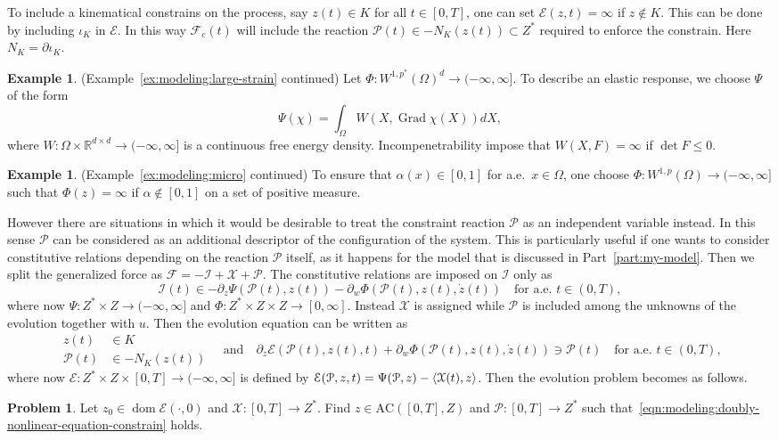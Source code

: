 \documentclass[a4paper,10pt,oneside]{amsbook}
\numberwithin{section}{chapter}
\numberwithin{equation}{chapter}
\theoremstyle{definition}
\newtheorem{ex}[prop]{Example}
\newtheorem{prb}[prop]{Problem}
\DeclareMathOperator{\dom}{dom}
\DeclareMathOperator{\Grad}{Grad}
\DeclarePairedDelimiter{\dual}{\langle}{\rangle}
\begin{document}
To include a kinematical constrains on the process, say $z(t)\in K$ for all $t\in[0,T]$, one can set $\mathcal{E}(z,t)=\infty$ if $z\notin K$. This can be done by including $\iota_K$ in $\mathcal{E}$. In this way $\mathcal{F}_c(t)$ will include the reaction $\mathcal{P}(t)\in-N_K(z(t))\subset Z^*$ required to enforce the constrain. Here $N_K=\partial\iota_K$.
\begin{ex}(Example~\ref{ex:modeling:large-strain} continued)
Let $\Phi\colon W^{1,p^*}(\Omega)^d\to(-\infty,\infty]$. To describe an elastic response, we choose $\Psi$ of the form
\[
\Psi(\chi)=\int_\Omega W(X,\Grad\chi(X))dX,
\]
where $W\colon\Omega\times\mathbb{R}^{d\times d}\to(-\infty,\infty]$ is a continuous free energy density. Incompenetrability impose that $W(X,F)=\infty$ if $\det F\le0$.
\end{ex}
\begin{ex}(Example~\ref{ex:modeling:micro} continued)
To ensure that $\alpha(x)\in[0,1]$ for a.e.\ $x\in\Omega$, one choose $\Phi\colon W^{1,p}(\Omega)\to(-\infty,\infty]$ such that $\Phi(z)=\infty$ if $\alpha\notin[0,1]$ on a set of positive measure.
\end{ex}
However there are situations in which it would be desirable to treat the constraint reaction $\mathcal{P}$ as an independent variable instead. In this sense $\mathcal{P}$ can be considered as an additional descriptor of the configuration of the system. This is particularly useful if one wants to consider constitutive relations depending on the reaction $\mathcal{P}$ itself, as it happens for the model that is discussed in Part~\ref{part:my-model}. Then we split the generalized force as $\mathcal{F}=-\mathcal{I}+\mathcal{X}+\mathcal{P}$. The constitutive relations are imposed on $\mathcal{I}$ only as
\[
\mathcal{I}(t)\in-\partial_z\Psi(\mathcal{P}(t),z(t))-\partial_w\Phi(\mathcal{P}(t),z(t),\dot z(t))\quad\text{for a.e.\ $t\in(0,T)$},
\]
where now $\Psi\colon Z^*\times Z\to(-\infty,\infty]$ and $\Phi\colon Z^*\times Z\times Z\to[0,\infty]$. Instead
$\mathcal{X}$ is assigned while $\mathcal{P}$ is included among the unknowns of the evolution together with $u$. Then the evolution equation can be written as
\begin{equation}
\label{eqn:modeling:doubly-nonlinear-equation-constrain}
\begin{split}
z(t)&\in K\\
\mathcal{P}(t)&\in-N_K(z(t))
\end{split}
\quad\text{and}\quad\partial_z\mathcal{E}(\mathcal{P}(t),z(t),t)+\partial_w\Phi(\mathcal{P}(t),z(t),\dot z(t))\ni\mathcal{P}(t)\quad\text{for a.e.\ $t\in(0,T)$},
\end{equation}
where now $\mathcal{E}\colon Z^*\times Z\times[0,T]\to(-\infty,\infty]$ is defined by $\mathcal{E}(\mathcal{P},z,t)=\Psi(\mathcal{P},z)-\dual{\mathcal{X}(t),z}$. Then the evolution problem becomes as follows.
\begin{prb}
\label{prb:constrained}
Let $z_0\in\dom\mathcal{E}(\cdot,0)$ and $\mathcal{X}\colon[0,T]\to Z^*$. Find $z\in\text{AC}([0,T],Z)$ and $\mathcal{P}\colon[0,T]\to Z^*$ such that~\eqref{eqn:modeling:doubly-nonlinear-equation-constrain} holds.
\end{prb}
\end{document}
